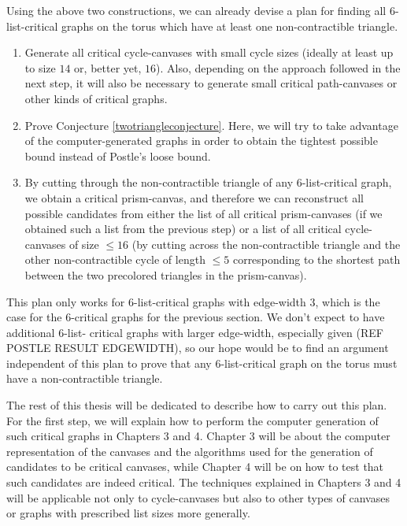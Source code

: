 Using the above two constructions, we can already devise a plan for finding all $6$-list-critical 
graphs on the torus which have at least one non-contractible triangle.

\begin{enumerate}
	\item Generate all critical cycle-canvases with small cycle sizes (ideally at least up to 
	size $14$ or, better yet, $16$). Also, depending on the approach followed in the next step, it will also be 
	necessary to generate small critical path-canvases or other kinds of critical graphs. 
	\item Prove Conjecture \ref{twotriangleconjecture}. Here, we will try to take advantage
	of the computer-generated graphs in order to obtain the tightest possible bound instead of
	Postle's loose bound.
	\item By cutting through the non-contractible triangle of any $6$-list-critical graph, we
	obtain a critical prism-canvas, and therefore we can reconstruct all possible candidates
	from either the list of all critical prism-canvases (if we obtained such a list from the
	previous step) or a list of all critical cycle-canvases of size $\leq 16$ (by cutting 
	across the non-contractible triangle and the other non-contractible cycle of length 
	$\leq 5$ corresponding to the shortest path between the two precolored triangles in the
	prism-canvas).
\end{enumerate}

This plan only works for $6$-list-critical graphs with edge-width $3$, which is the case for 
the $6$-critical graphs for the previous section. We don't expect to have additional $6$-list-
critical graphs with larger edge-width, especially given (REF POSTLE RESULT EDGEWIDTH), so our
hope would be to find an argument independent of this plan to prove that any $6$-list-critical
graph on the torus must have a non-contractible triangle. 



The rest of this thesis will be dedicated to describe how to carry out this plan. 
For the first step, we will explain how to perform the computer generation of such critical graphs
in Chapters 3 and 4. Chapter 3 will be about the computer representation of the canvases 	
and the algorithms used for the generation of candidates to be critical canvases, while 
Chapter 4 will be on how to test that such candidates are indeed critical. The techniques 
explained in Chapters 3 and 4 will be applicable not only to cycle-canvases but also to other
types of canvases or graphs with prescribed list sizes more generally. 

